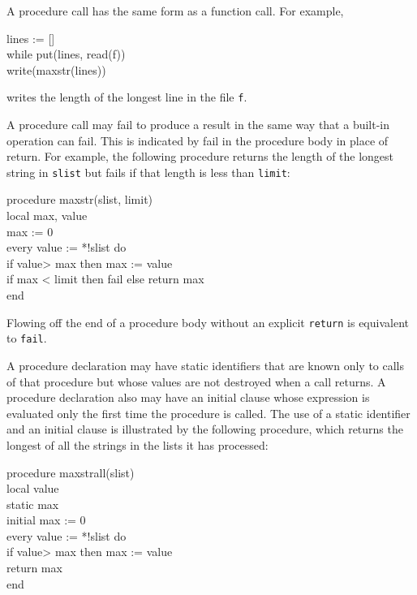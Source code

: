 A procedure call has the same form as a function call. For example,

\begin{iconcode}
\>lines := []\\
\>while put(lines, read(f))\\
\>write(maxstr(lines))
\end{iconcode}

\noindent
writes the length of the longest line in the file \texttt{f}.

A procedure call may fail to produce a result in the same way that a
built-in operation can fail. This is indicated by fail in the
procedure body in place of return. For example, the following
procedure returns the length of the longest string in \texttt{slist}
but fails if that length is less than \texttt{limit}:

\begin{iconcode}
\>procedure maxstr(slist, limit)\\
\>\>local max, value\\
\>\>max := 0\\
\>\>every value := *!slist do\\
\>\>\>if value> max then max := value\\
\>\>if max < limit then fail else return max\\
\>end
\end{iconcode}

\noindent Flowing off the end of a procedure body without an explicit
\texttt{return} is equivalent to \texttt{fail}.

A procedure declaration may have static identifiers that are known
only to calls of that procedure but whose values are not destroyed
when a call returns. A procedure declaration also may have an initial
clause whose expression is evaluated only the first time the procedure
is called. The use of a static identifier and an initial clause is
illustrated by the following procedure, which returns the longest of
all the strings in the lists it has processed:

\begin{iconcode}
\>procedure maxstrall(slist)\\
\>\>local value\\
\>\>static max\\
\>\>initial max := 0\\
\>\>every value := *!slist do\\
\>\>\>if value> max then max := value\\
\>\>return max\\
\>end
\end{iconcode}

